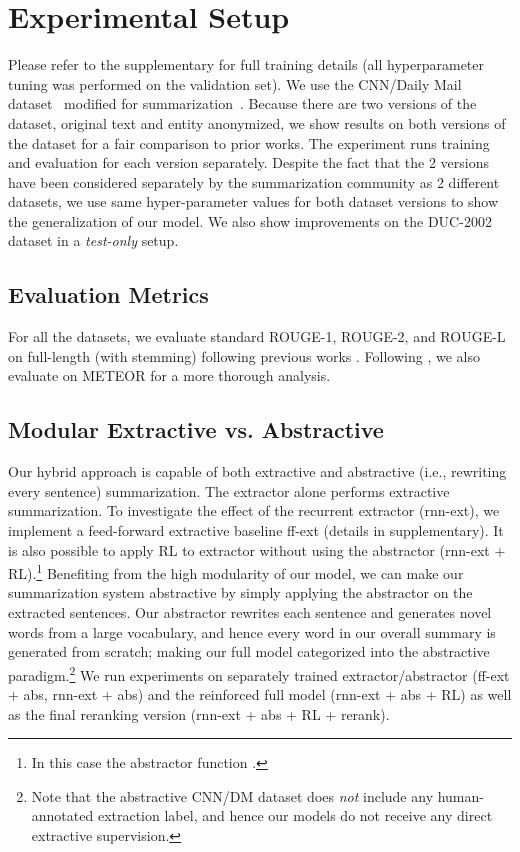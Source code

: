 \documentclass[11pt,a4paper]{article}
\begin{document}
\section{Experimental Setup}

Please refer to the supplementary for full training details (all hyperparameter tuning was performed on the validation set).
We use the CNN/Daily Mail dataset~\cite{nips15_hermann} modified for summarization~\cite{nallapati2016abstractive}.
Because there are two versions of the dataset, original text and entity anonymized,
we show results on both versions of the dataset for a fair comparison to prior works. 
The experiment runs training and evaluation for each version separately.
Despite the fact that the 2 versions have been considered separately by the summarization community as 2 different datasets, we use same hyper-parameter values for both dataset versions to show the generalization of our model.
We also show improvements on the DUC-2002 dataset in a \emph{test-only} setup.




\subsection{Evaluation Metrics}
For all the datasets, we evaluate standard ROUGE-1, ROUGE-2, and ROUGE-L \citep{lin:2004:ACLsummarization} on full-length  (with stemming) following previous works 
\citep{AAAI17:summarunner,get_to_the_point,DBLP:journals/corr/PaulusXS17}. 
Following \citet{get_to_the_point}, we also evaluate on METEOR \citep{denkowski:lavie:meteor-wmt:2014} for a more thorough analysis.


\subsection{Modular Extractive vs. Abstractive}
Our hybrid approach is capable of both extractive and abstractive (i.e., rewriting every sentence) summarization.
The extractor alone performs extractive summarization. 
To investigate the effect of the recurrent extractor (rnn-ext), we implement a feed-forward extractive baseline ff-ext (details in supplementary). 
It is also possible to apply RL to extractor without using the abstractor (rnn-ext + RL).\footnote{In this case the abstractor function .}
Benefiting from the high modularity of our model, we can make our summarization system abstractive by 
simply applying the abstractor on the extracted sentences.
Our abstractor rewrites each sentence and generates novel words from a large vocabulary, and hence every word in our overall summary is generated from scratch;
making our full model categorized into the abstractive paradigm.\footnote{Note that the abstractive CNN/DM dataset does \emph{not} include any human-annotated extraction label, and hence our models do not receive any direct extractive supervision.}
We run experiments on separately trained extractor/abstractor (ff-ext + abs, rnn-ext + abs) and the reinforced full model (rnn-ext + abs + RL) as well as the final reranking version (rnn-ext + abs + RL + rerank).
\end{document}
